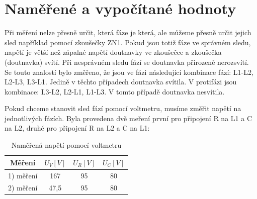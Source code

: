 \documentclass[12pt]{article} %
\begin{document}
\section{Naměřené a vypočítané hodnoty}
Při měření nelze přesně určit, která fáze je která, ale můžeme přesně určit jejich sled například pomocí zkoušečky ZN1. Pokud jsou totiž fáze ve správném sledu, napětí je větší než zápalné napětí doutnavky ve zkoušečce a zkoušečka (doutnavka) svítí. Při nesprávném sledu fází se doutnavka přirozeně nerozsvítí. Se touto znalostí bylo změřeno, že jsou ve fázi následující kombinace fází: L1-L2, L2-L3, L3-L1. Jedině v těchto případech doutnavka svítila. V protifázi jsou kombinace: L3-L2, L2-L1, L1-L3. V tomto případě doutnavka nesvítila.

Pokud chceme stanovit sled fází pomocí voltmetru, musíme změřit napětí na jednotlivých fázích. Byla provedena dvě meření první pro připojení R na L1 a C na L2, druhé pro připojení R na L2 a C na L1:
\begin{table}[H]
\center
\caption{Naměřená napětí pomocí voltmetru}
\begin{tabular}{|c|c|c|c|}
\hline 
Měření & $U_V [V]$ & $U_R [V]$ & $U_C [V]$ \\ 
\hline 
1) měření & 167 & 95 & 80 \\ 
\hline 
2) měření & 47,5 & 95 & 80 \\ 
\hline 
\end{tabular} 
\end{table}
\end{document}
